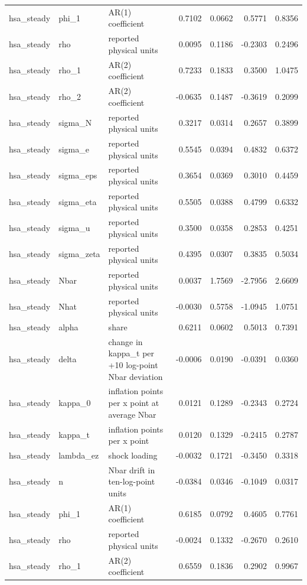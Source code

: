 \begin{tabular}{lllrrrr}
hsa\_steady & phi\_1 & AR(1) coefficient & 0.7102 & 0.0662 & 0.5771 & 0.8356 \\
hsa\_steady & rho & reported physical units & 0.0095 & 0.1186 & -0.2303 & 0.2496 \\
hsa\_steady & rho\_1 & AR(2) coefficient & 0.7233 & 0.1833 & 0.3500 & 1.0475 \\
hsa\_steady & rho\_2 & AR(2) coefficient & -0.0635 & 0.1487 & -0.3619 & 0.2099 \\
hsa\_steady & sigma\_N & reported physical units & 0.3217 & 0.0314 & 0.2657 & 0.3899 \\
hsa\_steady & sigma\_e & reported physical units & 0.5545 & 0.0394 & 0.4832 & 0.6372 \\
hsa\_steady & sigma\_eps & reported physical units & 0.3654 & 0.0369 & 0.3010 & 0.4459 \\
hsa\_steady & sigma\_eta & reported physical units & 0.5505 & 0.0388 & 0.4799 & 0.6332 \\
hsa\_steady & sigma\_u & reported physical units & 0.3500 & 0.0358 & 0.2853 & 0.4251 \\
hsa\_steady & sigma\_zeta & reported physical units & 0.4395 & 0.0307 & 0.3835 & 0.5034 \\
hsa\_steady & Nbar & reported physical units & 0.0037 & 1.7569 & -2.7956 & 2.6609 \\
hsa\_steady & Nhat & reported physical units & -0.0030 & 0.5758 & -1.0945 & 1.0751 \\
hsa\_steady & alpha & share & 0.6211 & 0.0602 & 0.5013 & 0.7391 \\
hsa\_steady & delta & change in kappa\_t per +10 log-point Nbar deviation & -0.0006 & 0.0190 & -0.0391 & 0.0360 \\
hsa\_steady & kappa\_0 & inflation points per x point at average Nbar & 0.0121 & 0.1289 & -0.2343 & 0.2724 \\
hsa\_steady & kappa\_t & inflation points per x point & 0.0120 & 0.1329 & -0.2415 & 0.2787 \\
hsa\_steady & lambda\_ez & shock loading & -0.0032 & 0.1721 & -0.3450 & 0.3318 \\
hsa\_steady & n & Nbar drift in ten-log-point units & -0.0384 & 0.0346 & -0.1049 & 0.0317 \\
hsa\_steady & phi\_1 & AR(1) coefficient & 0.6185 & 0.0792 & 0.4605 & 0.7761 \\
hsa\_steady & rho & reported physical units & -0.0024 & 0.1332 & -0.2670 & 0.2610 \\
hsa\_steady & rho\_1 & AR(2) coefficient & 0.6559 & 0.1836 & 0.2902 & 0.9967 \\

\end{tabular}
